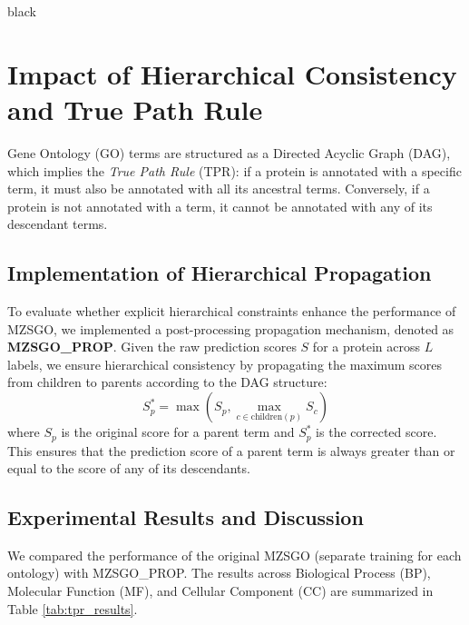 \documentclass{article}
\begin{document}
\newpage
\begin{color}{black}

\section{Impact of Hierarchical Consistency and True Path Rule}
\label{supp:tpr}

Gene Ontology (GO) terms are structured as a Directed Acyclic Graph (DAG), which implies the \textit{True Path Rule} (TPR)\cite{notaro2021hemdag}: if a protein is annotated with a specific term, it must also be annotated with all its ancestral terms. Conversely, if a protein is not annotated with a term, it cannot be annotated with any of its descendant terms. 

\subsection{Implementation of Hierarchical Propagation}
To evaluate whether explicit hierarchical constraints enhance the performance of MZSGO, we implemented a post-processing propagation mechanism, denoted as \textbf{MZSGO\_PROP}. Given the raw prediction scores $S$ for a protein across $L$ labels, we ensure hierarchical consistency by propagating the maximum scores from children to parents according to the DAG structure:
\begin{equation}
    S_{p}^* = \max \left( S_p, \max_{c \in \text{children}(p)} S_c \right)
\end{equation}
where $S_p$ is the original score for a parent term and $S_{p}^*$ is the corrected score. This ensures that the prediction score of a parent term is always greater than or equal to the score of any of its descendants.

\subsection{Experimental Results and Discussion}
We compared the performance of the original MZSGO (separate training for each ontology) with MZSGO\_PROP. The results across Biological Process (BP), Molecular Function (MF), and Cellular Component (CC) are summarized in Table \ref{tab:tpr_results}.


\end{color}
\end{document}
